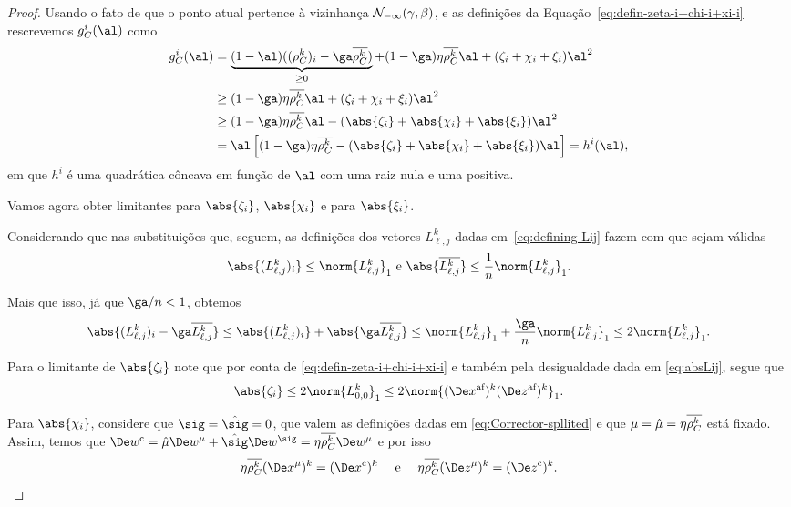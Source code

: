 \begin{proof}
Usando o fato de que o ponto atual pertence à vizinhança $\mathcal{N}_{-\infty}(\gamma,\beta)$, e as definições da Equação~\eqref{eq:defin-zeta-i+chi-i+xi-i} rescrevemos  $g_C^i(\al) $ como
\[
\begin{aligned}
	g_C^i (\al) & = \underbrace{(1-\al)((\rho_C^k )_i - \ga\rhoCkb )}_{\geq 0}  + (1-\ga)\eta\rhoCkb  \al+  (\zeta_i + 				\chi_i + \xi_i)\al^2  \\
				& \geq (1-\ga)\eta\rhoCkb  \al +  (\zeta_i + 				\chi_i + \xi_i)\al^2 \\ 
				& \geq (1-\ga)\eta\rhoCkb  \al -  (\abs{\zeta_i} + \abs{\chi_i} + \abs{\xi_i})\al^2 \\
				& = \al \left[	(1-\ga)\eta\rhoCkb   -  (\abs{\zeta_i} + \abs{\chi_i} + \abs{\xi_i})\al	\right] = h^i(\al),
\end{aligned}
\]
em que $h^i$ é uma quadrática côncava em função de $\al$ com uma raiz nula e uma positiva. 


Vamos agora obter limitantes para $\abs{\zeta_i}$, $ \abs{\chi_i}$ e para  $\abs{\xi_i}$.

Considerando que nas substituições que, seguem, as definições dos vetores $L_{\ell,j}^{k}$ dadas em~\eqref{eq:defining-Lij} fazem com que sejam válidas 
\begin{equation}
	\label{eq:normLij}
\abs{({L_{\ell,j}^{k}})_{i}} \leq \norm{L_{\ell,j}^{k}}_{1} \text{ e } \abs{\dbvec{L_{\ell,j}^{k}}} \leq \dfrac{1}{n}\norm{L_{\ell,j}^{k}}_{1}.
\end{equation}

Mais que isso, já que $\ga/n < 1$, obtemos
\begin{equation}\label{eq:absLij}
 	\abs{({L_{\ell,j}^{k}})_{i} - \ga\dbvec{L_{\ell,j}^{k}}} \leq  	\abs{({L_{\ell,j}^{k}})_{i}} + \abs{\ga\dbvec{L_{\ell,j}^{k}}} \leq  \norm{L_{\ell,j}^{k}}_{1}+ \frac{\ga}{n}\norm{L_{\ell,j}^{k}}_{1} \leq 2 \norm{L_{\ell,j}^{k}}_{1}.
 \end{equation} 

Para o limitante de $\abs{\zeta_{i}}$ note que por conta de \eqref{eq:defin-zeta-i+chi-i+xi-i} e também pela desigualdade dada em \eqref{eq:absLij}, segue que 
\begin{equation}
\abs{\zeta_i}    \leq 2\norm{L_{0,0}^{k}}_1 \label{eq:bound-zeta-i} \leq 2\norm{ \dekx  \dekz }_1.   %
\end{equation}

Para $\abs{\chi_{i}}$, considere que   $\sig = \nextsig=0$, que valem as definições dadas em \eqref{eq:Corrector-spllited} e que  $\mu=\hat{\mu} = \eta\overline{\rho_C^{k}}$ está fixado. Assim, temos que $\Decow = \nextmu \Dew^{\mu} + \nextsig
\Dew^{\sig} = \eta\rhoCkb \Dew^\mu $ e por isso 
	\[
		 \eta\rhoCkb (\Dex^\mu)^{k} = \Dekcox     \quad \text{ e } \quad    \eta\rhoCkb (\Dez^\mu)^{k} = \Dekcoz .
	\]


\end{proof}
